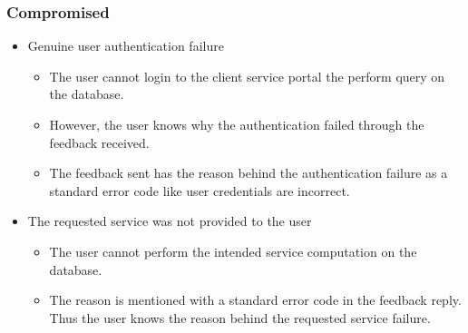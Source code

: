 \subsubsection{Compromised}
\begin{itemize}
    \item Genuine user authentication failure
          \begin{itemize}
              \item The user cannot login to the client service portal the perform query on the database.
              \item However, the user knows why the authentication failed through the feedback received.
              \item The feedback sent has the reason behind the authentication failure as a standard error code like user credentials are incorrect.
          \end{itemize}
    \item The requested service was not provided to the user
          \begin{itemize}
              \item The user cannot perform the intended service computation on the database.
              \item The reason is mentioned with a standard error code in the feedback reply. Thus the user knows the reason behind the requested service failure.
          \end{itemize}


\end{itemize}
